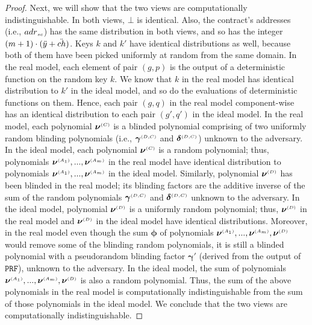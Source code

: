 \begin{proof}
 Next, we will show that the two views are computationally indistinguishable. In both views, $\bot$ is identical. Also, the contract’s addresses (i.e., ${adr}_{\scriptscriptstyle sc}$) has the same
distribution in both views, and so has the integer $(m+1)\cdot(\ddot{y}+\ddot{ch})$. Keys $k$ and $  k'$ have identical distributions as well, because both of them have been picked uniformly at random from the same domain.  In the real model, each element of pair $(g, p)$ is the output of a deterministic function on the random key $k$. We know that $k$ in the real model has identical distribution to $  k'$ in the ideal model, and so do the evaluations of deterministic functions on them. Hence, each pair $(g, q)$ in the real model component-wise has an identical distribution to each pair $(g', q')$ in the ideal model. In the real model, each polynomial  $\bm\nu^{\scriptscriptstyle (C)}$ is a blinded polynomial comprising of two uniformly random blinding polynomials (i.e., $\bm\gamma^{ \scriptscriptstyle {  {(D,C)}}}$ and $\bm\delta^{ \scriptscriptstyle {  {(D,C)}}}$) unknown to the adversary. In the ideal model, each polynomial  $ {\bm\nu}^{\scriptscriptstyle (C)}$ is a random polynomial; thus, polynomials $\bm\nu^{\scriptscriptstyle (A_1)},..., \bm\nu^{\scriptscriptstyle (A_m)}$ in the real model have identical distribution to  polynomials $ {\bm\nu}^{\scriptscriptstyle (A_1)}, ...,  {\bm\nu}^{\scriptscriptstyle (A_m)}$ in the ideal model.  Similarly,  polynomial $\bm\nu^{\scriptscriptstyle (D)}$ has been blinded in the real model; its blinding factors are the additive inverse of  the sum of the random polynomials $\bm\gamma^{ \scriptscriptstyle {  {(D,C)}}}$ and $\bm\delta^{ \scriptscriptstyle {  {(D,C)}}}$ unknown to the adversary. In the ideal model, polynomial $ {\bm\nu}^{\scriptscriptstyle (D)}$ is a uniformly random polynomial; thus, ${\bm\nu}^{\scriptscriptstyle (D)}$ in the real model and $ {\bm\nu}^{\scriptscriptstyle (D)}$ in the ideal model have identical distributions.
Moreover, in the real model even though the sum $\bm\phi$ of polynomials  $\bm\nu^{\scriptscriptstyle (A_1)},..., \bm\nu^{\scriptscriptstyle (A_m)}, \bm\nu^{\scriptscriptstyle (D)}$ would remove some of the blinding random polynomials, it is still a blinded polynomial with a pseudorandom blinding factor $\bm\gamma'$ (derived from the output of $\mathtt{PRF}$), unknown to the adversary. In the ideal model, the sum of polynomials $ {\bm\nu}^{\scriptscriptstyle (A_1)}, ...,  {\bm\nu}^{\scriptscriptstyle (A_m)},  {\bm\nu}^{\scriptscriptstyle (D)}$ is also a random polynomial. Thus, the sum of the above polynomials in the real model is computationally indistinguishable from the sum of those polynomials in the ideal model. We conclude that the two views are computationally indistinguishable. 
\end{proof}















